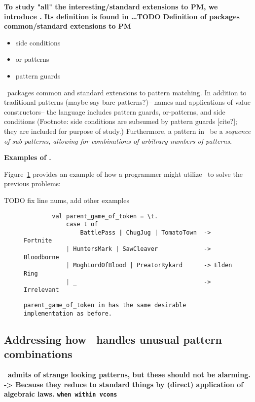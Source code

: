 \documentclass[manuscript,screen,review, 12pt]{acmart}
\begin{document}
\begin{outline}[enumerate]
    \1 \bf{To study "all" the interesting/standard extensions to PM, we introduce}
    \PPlus. Its definition is found in \dots TODO 
    \2 \bf{Definition of \PPlus}
    \2 \bf{{\PPlus} packages common/standard extensions to PM}
    \begin{itemize}
        \item side conditions
        \item or-patterns 
        \item pattern guards 
    \end{itemize}

    \PPlus\ packages common and standard extensions to pattern matching. In
    addition to traditional patterns (maybe say bare patterns?)-- names and
    applications of value constructors-- the language includes pattern guards,
    or-patterns, and side conditions (Footnote: side conditions are subsumed by
    pattern guards [cite?]; they are included for purpose of study.)
    Furthermore, a pattern in \PPlus\ be a \it{sequence} of sub-patterns,
    allowing for combinations of arbitrary numbers of patterns. 
    
    \3 \bf{Examples of \PPlus. }

    Figure~\ref{fig:ppexs} provides an example of how a programmer might utilize
    \PPlus\ to solve the previous problems: 

    TODO fix line nums, add other examples 
    \begin{figure}
        \begin{center}
            \pplst 
            \begin{lstlisting}
        val parent_game_of_token = \t. 
            case t of  
                BattlePass | ChugJug | TomatoTown  -> Fortnite
            | HuntersMark | SawCleaver             -> Bloodborne
            | MoghLordOfBlood | PreatorRykard      -> Elden Ring
            | _                                    -> Irrelevant
        \end{lstlisting}
        \end{center}    
        \caption{\tt{parent\_game\_of\_token} in \PPlus has the same desirable
        implementation as before.} 
        \label{fig:ppexs}
        \end{figure}
    
    
\subsection{Addressing how \PPlus\ handles unusual pattern combinations}
\2 \bf{\PPlus\ admits of strange looking patterns, but these should not be alarming. }
\2 \bf{-> Because they reduce to standard things by (direct) application of algebraic laws. }
\3 \bf{\tt{when} within vcons }


\end{outline}
\end{document}

